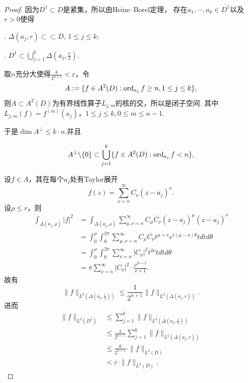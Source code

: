 \begin{proof} 因为$\overline{D^1}\subset D$是紧集，所以由Heine--Borel定理，
    存在$a_1,\cdots, a_k\in \overline{D^1}$以及$r>0$使得

	. $\Delta(a_j,r)\subset \subset D$, $1\leq j\leq k$;\par
	. $\overline{D^1}\subset \bigcup\limits_{j=1}^k \Delta(a_j,\frac{r}{2})$.

	取$n$充分大使得$\frac{k}{2^{n+1}}<\varepsilon$，令
	$$A:=\{f\in A^2(D): \operatorname{ord}_{a_j} f\geq n, 1\leq j\leq k\},$$
	则$A\subset A^2(D)$为有界线性算子$L_{j,m}$的核的交，所以是闭子空间.
    其中$L_{j,m}(f)=f^{(m)}(a_j)$，$1\leq j\leq k,0\leq m\leq n-1$. 
    
    于是$\dim A^{\perp}\leq k\cdot n$.并且

	$$A^{\perp}\backslash\{0\}\subset \bigcup\limits_{j=1}^k \{f\in A^2(D): \operatorname{ord}_{a_j}f<n\},$$

	设$f\in A$，其在每个$a_j$处有Taylor展开
    \[f(z)=\sum_{\nu=n}^\infty C_\nu (z-a_j)^\nu.\]
    设$\rho\leq r$，则
	\begin{align*}
		\int_{\Delta(a_j,\rho)} |f|^2 
        &=\int_{\Delta(a_j,\rho)} \sum_{\mu, \nu=n}^\infty C_\mu \overline{C_\nu} (z-a_j)^\mu (\overline{z-a_j})^\nu\\
		&=\int_0^\rho \int_0^{2\pi} \sum_{\mu, \nu=n}^\infty  C_\mu \overline{C_\nu} t^{\mu+\nu}e^{i(\mu-\nu)\theta} t dt d\theta\\
		&=\int_0^\rho \int_0^{2\pi} \sum_{\nu=n}^\infty |C_\nu|^2 t^{2\nu} t dt d\theta\\
		&=\pi \sum_{\nu=n}^\infty |C_\nu|^2 \cdot \frac{\rho^{2\nu+2}}{\nu+1}.
	\end{align*}
	故有
	$$\|f\|_{L^2(\Delta(a_j,\frac{r}{2}))}\leq \frac{1}{2^{n+1}} \|f\|_{L^2(\Delta(a_j,r))}.$$
	进而
	\begin{align*}
		\|f\|_{L^2(D^1)}&\leq \sum_{j=1}^k \|f\|_{L^2(\Delta(a_j,\frac{r}{2}))}\\
		&\leq \frac{1}{2^{n+1}} \sum_{j=1}^k  \|f\|_{L^2(\Delta(a_j,r))}\\
		&\leq \frac{k}{2^{n+1}} \cdot \|f\|_{L^2(D)}\\
		&< \varepsilon \cdot \|f\|_{L^2(D)}.
	\end{align*}
\end{proof}
		
